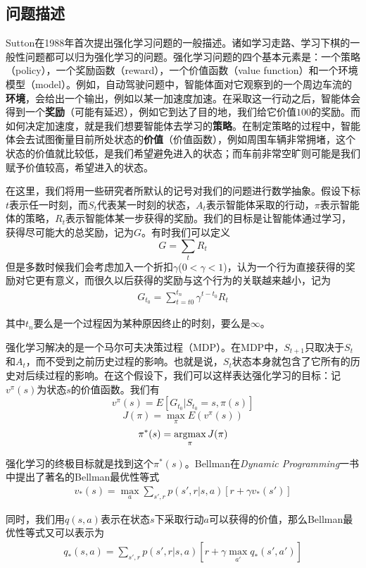     \subsection{问题描述}
      Sutton在1988年首次提出强化学习问题的一般描述\cite{Sutton_problem_formulation}。诸如学习走路、学习下棋的一般性问题都可以归为强化学习的问题。强化学习问题的四个基本元素是：一个策略（policy），一个奖励函数（reward），一个价值函数（value function）和一个环境模型（model）。例如，自动驾驶问题中，智能体面对它观察到的一个周边车流的\textbf{环境}，会给出一个输出，例如以某一加速度加速。在采取这一行动之后，智能体会得到一个\textbf{奖励}（可能有延迟），例如它到达了目的地，我们给它价值$100$的奖励。而如何决定加速度，就是我们想要智能体去学习的\textbf{策略}。在制定策略的过程中，智能体会去试图衡量目前所处状态的\textbf{价值}（价值函数），例如周围车辆非常拥堵，这个状态的价值就比较低，是我们希望避免进入的状态；而车前非常空旷则可能是我们赋予价值较高，希望进入的状态。\par
      在这里，我们将用一些研究者所默认的记号对我们的问题进行数学抽象。假设下标$t$表示任一时刻，而$S_t$代表某一时刻的状态，$A_t$表示智能体采取的行动，$\pi$表示智能体的策略，$R_t$表示智能体某一步获得的奖励。我们的目标是让智能体通过学习，获得尽可能大的总奖励，记为$G$。有时我们可以定义
      $$ G = \sum_{t} R_t $$
      但是多数时候我们会考虑加入一个折扣$\gamma$($0 < \gamma < 1$)，认为一个行为直接获得的奖励对它更有意义，而很久以后获得的奖励与这个行为的关联越来越小，记为
      \begin{align}
        G_{t_0} = \sum_{t = t0}^{t_n} \gamma^{t-t_0} R_t
        \label{eq:G}
      \end{align}
      \par 其中$t_n$要么是一个过程因为某种原因终止的时刻，要么是$\infty$。\par
      强化学习解决的是一个马尔可夫决策过程（MDP）\cite{Bellman_MDP}。在MDP中，$S_{t+1}$只取决于$S_t$和$A_t$，而不受到之前历史过程的影响。也就是说，$S_t$状态本身就包含了它所有的历史对后续过程的影响。在这个假设下，我们可以这样表达强化学习的目标\cite{DRL_for_driving}：记$v^{\pi}(s)$为状态$s$的价值函数。我们有$$ v^{\pi}(s) = E[G_{t_0} | S_{t_0} = s, \pi(s) ] $$
      $$ J(\pi) = \max_{\pi} E(v^{\pi}(s)) $$
      $$ \pi^*(s) = \operatorname*{argmax}_{\pi} J(\pi) $$
    \par 强化学习的终极目标就是找到这个$\pi^*(s)$。Bellman在\textit{Dynamic Programming}一书中提出了著名的Bellman最优性等式\cite{Bellman_DP}
    \begin{align}
       v_*(s) = \max_{a} \sum_{s', r}p(s', r | s, a)[r + \gamma v_*(s')]
    \end{align}
    \par 同时，我们用$q(s, a)$表示在状态$s$下采取行动$a$可以获得的价值，那么Bellman最优性等式又可以表示为
    \begin{align}
       q_*(s, a) = \sum_{s', r}p(s', r | s, a)[r + \gamma \max_{a'} q_*(s', a')]
    \end{align}


